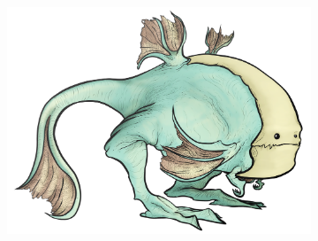 \begin{figure}[H]
  \centering\begin{subfigure}{.5\textwidth}
    \centering
    \includegraphics[width=.9\linewidth]{images/ref_SEAN01}
  \end{subfigure}
  \begin{subfigure}{.11\textwidth}
    \centering

\end{subfigure}
\end{figure}
